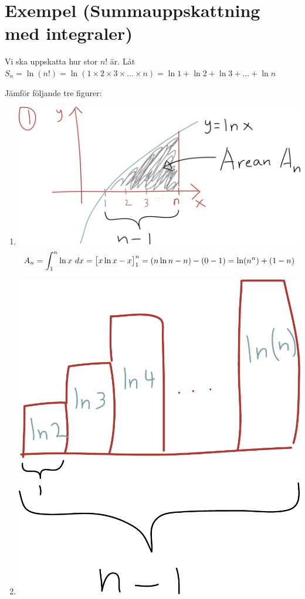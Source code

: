 \documentclass{article}
\begin{document}
\section{Exempel (Summauppskattning med integraler)}
Vi ska uppskatta hur stor $n! $ är.
Låt $S_n = \ln(n!) = \ln(1\times 2\times 3\times\dots\times n) = \ln 1 + \ln 2 + \ln 3 + \dots + \ln n$

Jämför följande tre figurer:
\begin{enumerate}
  \item
    \includegraphics[scale=0.25]{img/img5.pdf}\\
    $$ A_n =\int^n_1{\ln x\ dx} = \left[\begin{matrix}x \ln x - x\end{matrix}\right]^n_1 = (n\ln n - n) - (0-1) = \ln(n^n) + (1-n)$$
  \item
    \includegraphics[scale=0.25]{img/img6.pdf}\\

\end{enumerate}
\end{document}
